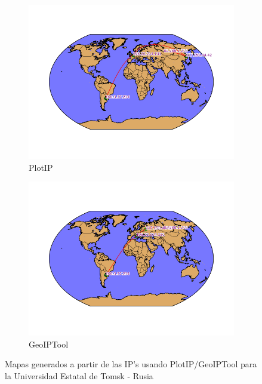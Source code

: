 \begin{figure}[ht]
	\begin{subfigure}[b]{0.5\textwidth}
		\centering
		\includegraphics[width=\linewidth]{imagenes/mapa_tsu_plotip.png}
		\caption{PlotIP}
		\label{fig:mapa_tsu_plotip}
	\end{subfigure}
	\begin{subfigure}[b]{0.5\textwidth}
		\centering
		\includegraphics[width=\linewidth]{imagenes/mapa_tsu_geoip.png}
		\caption{GeoIPTool}
	\end{subfigure}
	\caption{Mapas generados a partir de las IP's usando PlotIP/GeoIPTool para la Universidad Estatal de Tomsk - Rusia}
	\label{fig:mapas_tsu}
\end{figure}

